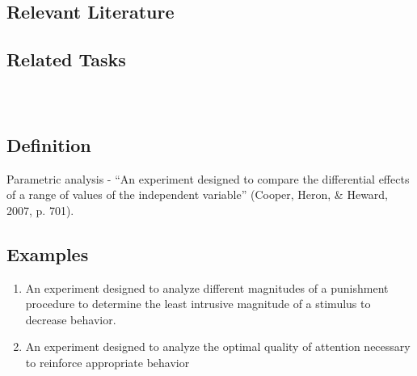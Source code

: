 \subsection{Relevant Literature}
\begin{refsection}
\nocite{test,alang2017police,clayton2018black}
\printbibliography[heading=none]
\end{refsection}
%
\subsection{Related Tasks} 
\fourbThree{}\\
%
%
%
%
%
\section[\fourbEleven{}]{\fourbEleven{}%
              }
\subsection{Definition}
Parametric analysis - ``An experiment designed to compare the differential effects of a range of values of the independent variable'' (Cooper, Heron, \& Heward, 2007, p. 701).
%
\subsection{Examples}
\begin{enumerate}
\item An experiment designed to analyze different magnitudes of a punishment procedure to determine the least intrusive magnitude of a stimulus to decrease behavior.
\item An experiment designed to analyze the optimal quality of attention necessary to reinforce appropriate behavior 
\end{enumerate}
%
